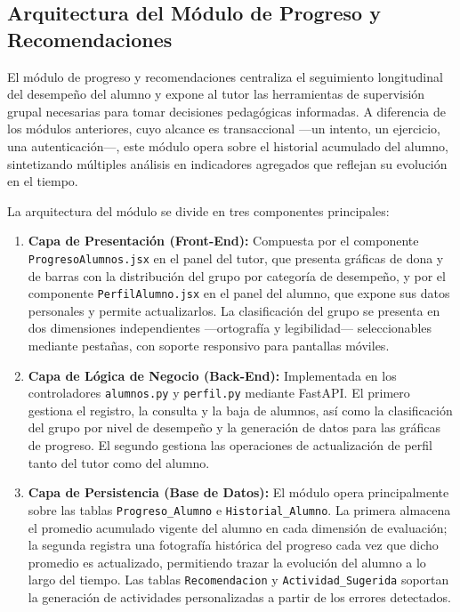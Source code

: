 
\subsection{Arquitectura del Módulo de Progreso y Recomendaciones}

El módulo de progreso y recomendaciones centraliza el seguimiento
longitudinal del desempeño del alumno y expone al tutor las herramientas
de supervisión grupal necesarias para tomar decisiones pedagógicas
informadas. A diferencia de los módulos anteriores, cuyo alcance es
transaccional —un intento, un ejercicio, una autenticación—, este módulo
opera sobre el historial acumulado del alumno, sintetizando múltiples
análisis en indicadores agregados que reflejan su evolución en el tiempo.

La arquitectura del módulo se divide en tres componentes principales:

\begin{enumerate}
    \item \textbf{Capa de Presentación (Front-End):} Compuesta por el
    componente \texttt{ProgresoAlumnos.jsx} en el panel del tutor, que
    presenta gráficas de dona y de barras con la distribución del grupo
    por categoría de desempeño, y por el componente
    \texttt{PerfilAlumno.jsx} en el panel del alumno, que expone sus
    datos personales y permite actualizarlos. La clasificación del grupo
    se presenta en dos dimensiones independientes —ortografía y
    legibilidad— seleccionables mediante pestañas, con soporte
    responsivo para pantallas móviles.

    \item \textbf{Capa de Lógica de Negocio (Back-End):} Implementada
    en los controladores \texttt{alumnos.py} y \texttt{perfil.py}
    mediante FastAPI. El primero gestiona el registro, la consulta y la
    baja de alumnos, así como la clasificación del grupo por nivel de
    desempeño y la generación de datos para las gráficas de progreso.
    El segundo gestiona las operaciones de actualización de perfil tanto
    del tutor como del alumno.

    \item \textbf{Capa de Persistencia (Base de Datos):} El módulo opera
    principalmente sobre las tablas \texttt{Progreso\_Alumno} e
    \texttt{Historial\_Alumno}. La primera almacena el promedio acumulado
    vigente del alumno en cada dimensión de evaluación; la segunda
    registra una fotografía histórica del progreso cada vez que dicho
    promedio es actualizado, permitiendo trazar la evolución del alumno
    a lo largo del tiempo. Las tablas \texttt{Recomendacion} y
    \texttt{Actividad\_Sugerida} soportan la generación de actividades
    personalizadas a partir de los errores detectados.
\end{enumerate}

